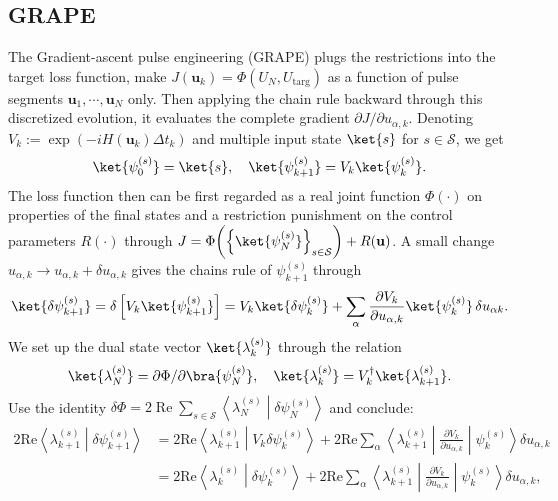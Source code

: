 \subsection{GRAPE}
The Gradient-ascent pulse engineering (GRAPE)  plugs the restrictions into the target loss function, make $J(\mathbf{u}_k)=\Phi(U_{N}, U_{\mathrm{targ}})$ as a function of pulse segments $\mathbf{u}_1,\cdots,\mathbf{u}_N$ only.
Then applying the chain rule backward through this discretized evolution,
it evaluates the complete gradient $\partial J/\partial u_{\alpha,k}$.
Denoting $V_k := \exp\left(-iH(\mathbf u_k) \Delta t_k\right)$ and multiple input state $\ket{s}$ for $s\in\mathcal S$, we get 
\begin{align}\label{eq:forward}
    \ket{\psi_0^{(s)}}=\ket{s},\quad \ket{\psi_{k+1}^{(s)}}=V_k\ket{\psi_k^{(s)}}.
\end{align}
The loss function then can be first regarded as a real joint function $\Phi(\cdot)$ on properties of the final states and a restriction punishment on the control parameters $R(\cdot)$
through $J=\Phi\!\left(\left\{\ket{\psi_N^{(s)}}\right\}_{s\in\mathcal S}\right) + R(\mathbf{u})$.
A small change $u_{\alpha, k} \to u_{\alpha, k}+\delta u_{\alpha, k}$ gives the chains rule of $\psi_{k+1}^{(s)}$ through
\begin{align}
 \ket{\delta\psi_{k+1}^{(s)}}
= \delta \left[V_k \ket{\psi_{k+1}^{(s)}}\right]
= V_k\ket{\delta\psi_k^{(s)}}
+ \sum_\alpha \frac{\partial V_k}{\partial u_{\alpha,k}} \ket{\psi_k^{(s)}}\, \delta u_{\alpha k}.
\end{align}
We set up the dual state vector $\ket{\lambda_k^{(s)}}$ through the relation
\begin{align}\label{eq:backward}
    \ket{\lambda_N^{(s)}}=\partial \Phi /\partial \bra{\psi_N^{(s)}}, \quad 
\ket{\lambda_k^{(s)}}=V_k^\dagger\ket{\lambda_{k+1}^{(s)}}.
\end{align}
Use the identity $\delta\Phi= 2\operatorname{Re} \sum_{s\in\mathcal S} \left\langle \lambda_N^{(s)} \middle|\delta\psi_N^{(s)}\right\rangle$ and conclude:
\begin{align}
    2\mathrm{Re}\left\langle\lambda_{k+1}^{(s)}\middle|\delta\psi_{k+1}^{(s)}\right\rangle
&=2\mathrm{Re}\left\langle\lambda_{k+1}^{(s)}\middle|V_k\delta\psi_k^{(s)}\right\rangle+
2\mathrm{Re}\sum_\alpha\left\langle\lambda_{k+1}^{(s)}\middle|\frac{\partial V_k}{\partial u_{\alpha,k}}\middle|\psi_k^{(s)}\right\rangle\delta u_{\alpha,k}\\
&=2\mathrm{Re}\left\langle\lambda_{k}^{(s)}\middle|\delta\psi_k^{(s)}\right\rangle+
2\mathrm{Re}\sum_\alpha\left\langle\lambda_{k+1}^{(s)}\middle|\frac{\partial V_k}{\partial u_{\alpha,k}}\middle|\psi_k^{(s)}\right\rangle\delta u_{\alpha,k},
\end{align}
